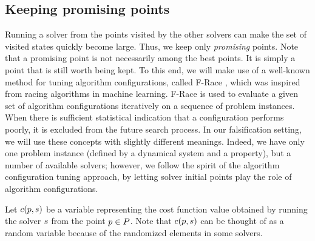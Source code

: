 \subsection{Keeping promising points}
Running a solver from the points visited by the other solvers can make the set of visited states quickly become large. Thus, we keep only {\em promising} points. Note that a promising point is not necessarily among the best points. It is simply a point that is still worth being kept. To this end, we will make use of a well-known method for tuning algorithm configurations, called F-Race \cite{Birattari2010}, which was inspired from racing algorithms in machine learning. F-Race is used to evaluate a given set of algorithm configurations iteratively on a sequence of problem instances. When there is sufficient statistical indication that a configuration performs poorly, it is excluded from the future search process. In our falsification setting, we will use these concepts with slightly different meanings. Indeed, we have only one problem instance (defined by a dynamical system and a property), but a number of available solvers; however, we follow the spirit of the algorithm configuration tuning approach, by letting solver initial points play the role of algorithm configurations.

Let $c(p, s)$ be a variable representing the cost function value obtained by running the solver $s$ from the point $p \in P$. Note that $c(p, s)$ can be thought of as a random variable because of the randomized elements in some solvers. 

